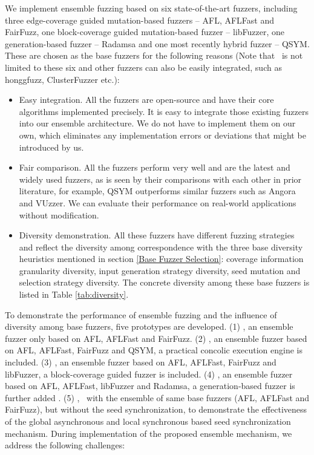We implement ensemble fuzzing based on six state-of-the-art fuzzers, including three edge-coverage guided mutation-based fuzzers -- AFL, AFLFast and FairFuzz, one block-coverage guided mutation-based fuzzer -- libFuzzer, one generation-based fuzzer -- Radamsa and one most recently hybrid fuzzer -- QSYM. These are chosen as the base fuzzers for the following reasons (Note that \toolThree ~is not limited to these six and other fuzzers can also be easily integrated, such as honggfuzz, ClusterFuzzer etc.):

\begin{itemize}
\item Easy integration.
All the fuzzers are open-source and have their core algorithms implemented precisely. It is easy to integrate those existing fuzzers into our ensemble architecture. We do not have to implement them on our own, which eliminates any implementation errors or deviations that might be introduced by us.

\item Fair comparison. All the fuzzers perform very well and are the latest and widely used fuzzers, as is seen by their comparisons with each other in prior literature, for example, QSYM outperforms similar fuzzers such as Angora\cite{chen2018angora} and VUzzer. We can evaluate their performance on real-world applications without modification.

\item Diversity demonstration. All these fuzzers have different fuzzing strategies and reflect the diversity among  correspondence with the three base diversity heuristics mentioned in section \ref{Base Fuzzer Selection}: coverage information granularity diversity, input generation strategy diversity,  seed mutation and selection strategy diversity. The concrete diversity among these base fuzzers is listed in Table \ref{tab:diversity}.

\end{itemize}

To demonstrate the performance of ensemble fuzzing and the influence of diversity among base fuzzers, 
five prototypes are developed. (1) \toolOne, an ensemble fuzzer only based on AFL, AFLFast and FairFuzz. 
(2) \toolFive, an ensemble fuzzer based on AFL, AFLFast, FairFuzz and QSYM, a practical concolic execution engine is included. 
(3) \toolTwo, an ensemble fuzzer based on AFL, AFLFast, FairFuzz and libFuzzer, a block-coverage guided fuzzer is included. %
(4) \toolThree, an ensemble fuzzer based on AFL, AFLFast, libFuzzer and Radamsa, a generation-based fuzzer is further added .%
(5) \toolFour, ~with the ensemble of same base fuzzers (AFL, AFLFast and FairFuzz), but without the seed synchronization, to demonstrate the effectiveness of the global asynchronous and local synchronous based seed synchronization mechanism.  
During implementation of the proposed ensemble mechanism, we address the following challenges: 


